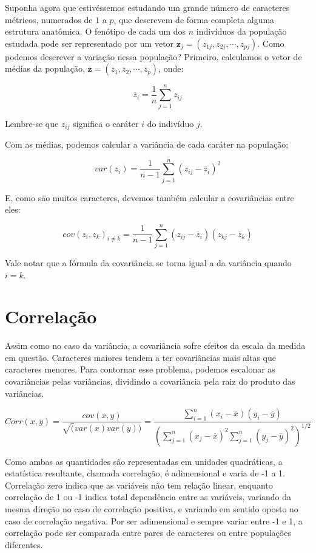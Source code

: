 \documentclass[portuges,]{tufte-handout}
\begin{document}
Suponha agora que estivéssemos estudando um grande número de caracteres
métricos, numerados de \(1\) a \(p\), que descrevem de forma completa
alguma estrutura anatômica. O fenótipo de cada um dos \(n\) indivíduos
da população estudada pode ser representado por um vetor
\(\mathbf{z}_j = (z_{1j}, z_{2j}, \cdots, z_{pj})\). Como podemos
descrever a variação nessa população? Primeiro, calculamos o vetor de
médias da população,
\(\mathbf{\overline z} = (\overline z_1, \overline z_2, \cdots, \overline z_p)\),
onde:

\[
\overline z_i = \frac{1}{n} \sum_{j=1}^n z_{ij}
\]

Lembre-se que \(z_{ij}\) significa o caráter \(i\) do indivíduo \(j\).

Com as médias, podemos calcular a variância de cada caráter na
população:

\[
var(z_i) = \frac{1}{n-1} \sum_{j=1}^n (z_{ij} - \overline z_i)^2
\]

E, como são muitos caracteres, devemos também calcular a covariâncias
entre eles:

\[
cov(z_i, z_k)_{i \ne k} = \frac{1}{n-1} \sum_{j=1}^n (z_{ij} - \overline z_i)(z_{kj} - \overline z_k)
\]

Vale notar que a fórmula da covariância se torna igual a da variância
quando \(i=k\).

\section{Correlação}\label{correlauxe7uxe3o}

Assim como no caso da variância, a covariância sofre efeitos da escala
da medida em questão. Caracteres maiores tendem a ter covariâncias mais
altas que caracteres menores. Para contornar esse problema, podemos
escalonar as covariâncias pelas variâncias, dividindo a covariância pela
raiz do produto das variâncias.

\[
Corr(x, y) = \frac{cov(x, y)}{\sqrt(var(x)var(y))} = \frac{\sum_{i=1}^n (x_i - \overline x)(y_i - \overline y)}{(\sum_{j=1}^n (x_j - \overline x)^2\sum_{j=1}^n(y_j - \overline y)^2)^{1/2}}
\]

Como ambas as quantidades são representadas em unidades quadráticas, a
estatística resultante, chamada correlação, é adimensional e varia de -1
a 1. Correlação zero indica que as variáveis não tem relação linear,
enquanto correlação de 1 ou -1 indica total dependência entre as
variáveis, variando da mesma direção no caso de correlação positiva, e
variando em sentido oposto no caso de correlação negativa. Por ser
adimensional e sempre variar entre -1 e 1, a correlação pode ser
comparada entre pares de caracteres ou entre populações diferentes.
\end{document}
